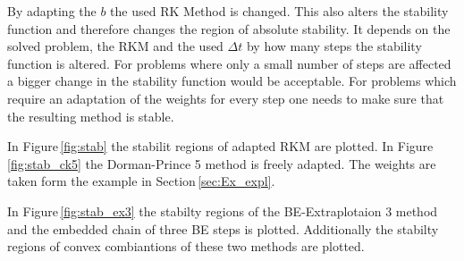 \documentclass[a4paper]{article}
\numberwithin{equation}{section}
\theoremstyle{plain}
\theoremstyle{definition}
\numberwithin{theorem}{section}
\newcommand{\dt}{{\Delta t}}
\newcommand{\1}{\mathbbm{1}}
\begin{document}
By adapting the $b$ the used RK Method is changed. This also alters the stability function and therefore changes the region of absolute stability. 
It depends on the solved problem, the RKM and the used $\dt$ by how many steps the stability function is altered. For problems where only a small number of steps are affected a bigger change in the stability function would be acceptable. For problems which require an adaptation of the weights for every step one needs to make sure that the resulting method is stable.

In Figure\,\ref{fig:stab} the stabilit regions of adapted RKM are plotted. 
In Figure\,\ref{fig:stab_ck5} the Dorman-Prince 5 method is freely adapted. 
The weights are taken form the example in Section\,\ref{sec:Ex_expl}. 

In Figure\,\ref{fig:stab_ex3} the stabilty regions of the BE-Extraplotaion 3 method and the embedded chain of three BE steps is plotted. Additionally the stabilty regions of convex combiantions of these two methods are plotted.
\end{document}
